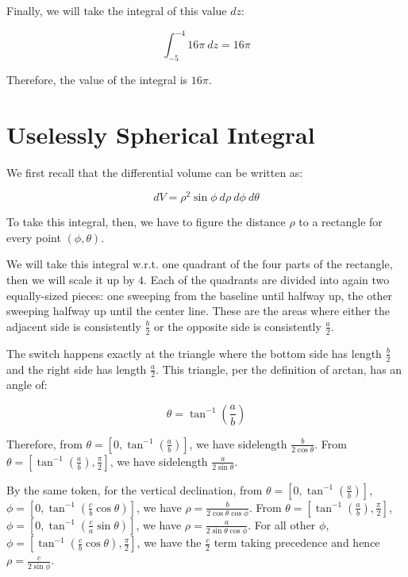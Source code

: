 \documentclass[letterpaper]{article}
\begin{document}
Finally, we will take the integral of this value \(dz\):

\begin{equation}
   \int_{-5}^{-4} 16\pi\ dz  = 16\pi
\end{equation}

Therefore, the value of the integral is \(16\pi\).

\section{Uselessly Spherical Integral}
\label{sec:org79e92b8}
We first recall that the differential volume can be written as:

\begin{equation}
   dV = \rho^2 \sin \phi\ d\rho\ d\phi\ d\theta
\end{equation}

To take this integral, then, we have to figure the distance \(\rho\) to a rectangle for every point \((\phi, \theta)\).

We will take this integral w.r.t. one quadrant of the four parts of the rectangle, then we will scale it up by \(4\). Each of the quadrants are divided into again two equally-sized pieces: one sweeping from the baseline until halfway up, the other sweeping halfway up until the center line. These are the areas where either the adjacent side is consistently \(\frac{b}{2}\) or the opposite side is consistently \(\frac{a}{2}\).

The switch happens exactly at the triangle where the bottom side has length \(\frac{b}{2}\) and the right side has length \(\frac{a}{2}\). This triangle, per the definition of arctan, has an angle of:

\begin{equation}
   \theta = \tan^{-1}\left(\frac{a}{b}\right) 
\end{equation}

Therefore, from \(\theta = [0, \tan^{-1}\left(\frac{a}{b}\right)]\), we have sidelength \(\frac{b}{2\cos\theta}\). From \(\theta = [\tan^{-1}\left(\frac{a}{b}\right), \frac{\pi}{2}]\), we have sidelength \(\frac{a}{2\sin\theta}\).

By the same token, for the vertical declination, from \(\theta = [0, \tan^{-1}\left(\frac{a}{b}\right)]\), \(\phi = [0,\tan^{-1}\left(\frac{c}{b}\cos\theta\right)]\), we have \(\rho=\frac{b}{2\cos\theta\cos\phi}\). From \(\theta = [\tan^{-1}\left(\frac{a}{b}\right), \frac{\pi}{2}]\), \(\phi = [0,\tan^{-1}\left(\frac{c}{a}\sin\theta\right)]\), we have \(\rho=\frac{a}{2\sin\theta\cos\phi}\). For all other \(\phi\), \(\phi = [\tan^{-1}\left(\frac{c}{b}\cos\theta\right), \frac{\pi}{2}]\), we have the \(\frac{c}{2}\) term taking precedence and hence \(\rho = \frac{c}{2\sin\phi}\). 
\end{document}
